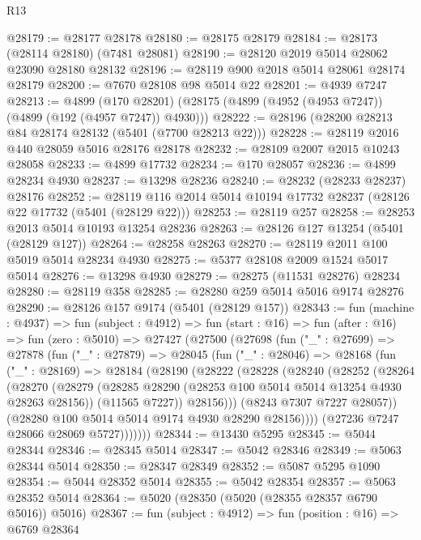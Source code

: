 \begin{lexlean}{R13}
\begin{coremodule}
@28179 := @28177 @28178
@28180 := @28175 @28179
@28184 := @28173 (@28114 @28180) (@7481 @28081)
@28190 := @28120 @2019 @5014 @28062 @23090 @28180 @28132
@28196 := @28119 @900 @2018 @5014 @28061 @28174 @28179
@28200 := @7670 @28108 @98 @5014 @22
@28201 := @4939 @7247
@28213 := @4899
    (@170 @28201)
    (@28175 (@4899 (@4952 (@4953 @7247)) (@4899 (@192 (@4957 @7247)) @4930)))
@28222 := @28196 (@28200 @28213 @84 @28174 @28132 (@5401 (@7700 @28213 @22)))
@28228 := @28119 @2016 @440 @28059 @5016 @28176 @28178
@28232 := @28109 @2007 @2015 @10243 @28058
@28233 := @4899 @17732
@28234 := @170 @28057
@28236 := @4899 @28234 @4930
@28237 := @13298 @28236
@28240 := @28232 (@28233 @28237) @28176
@28252 := @28119 @116 @2014 @5014 @10194 @17732 @28237 (@28126 @22 @17732 (@5401 (@28129 @22)))
@28253 := @28119 @257
@28258 := @28253 @2013 @5014 @10193 @13254 @28236
@28263 := @28126 @127 @13254 (@5401 (@28129 @127))
@28264 := @28258 @28263
@28270 := @28119 @2011 @100 @5019 @5014 @28234 @4930
@28275 := @5377 @28108 @2009 @1524 @5017 @5014
@28276 := @13298 @4930
@28279 := @28275 (@11531 @28276) @28234
@28280 := @28119 @358
@28285 := @28280 @259 @5014 @5016 @9174 @28276
@28290 := @28126 @157 @9174 (@5401 (@28129 @157))
@28343 := fun (machine : @4937) =>
  fun (subject : @4912) =>
  fun (start : @16) =>
  fun (after : @16) =>
  fun (zero : @5010) =>
  @27427
    (@27500
      (@27698
        (fun ("_" : @27699) =>
        @27878
          (fun ("_" : @27879) =>
          @28045
            (fun ("_" : @28046) =>
            @28168
              (fun ("_" : @28169) =>
              @28184
                (@28190
                  (@28222
                    (@28228
                      (@28240
                        (@28252
                          (@28264
                            (@28270
                              (@28279
                                (@28285 @28290 (@28253 @100 @5014 @5014 @13254 @4930 @28263 @28156))
                                (@11565 @7227))
                              @28156)))
                        (@8243 @7307 @7227 @28057))
                      (@28280 @100 @5014 @5014 @9174 @4930 @28290 @28156))))
                (@27236 @7247 @28066 @28069 @5727)))))))
@28344 := @13430 @5295
@28345 := @5044 @28344
@28346 := @28345 @5014
@28347 := @5042 @28346
@28349 := @5063 @28344 @5014
@28350 := @28347 @28349
@28352 := @5087 @5295 @1090
@28354 := @5044 @28352 @5014
@28355 := @5042 @28354
@28357 := @5063 @28352 @5014
@28364 := @5020 (@28350 (@5020 (@28355 @28357 @6790 @5016)) @5016)
@28367 := fun (subject : @4912) => fun (position : @16) => @6769 @28364

\end{coremodule}
\end{lexlean}
